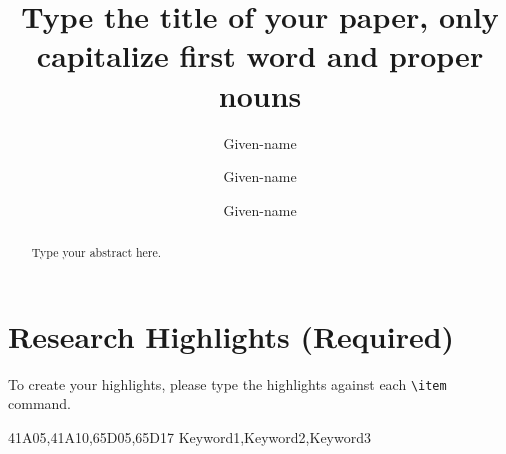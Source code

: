 \documentclass[times,twocolumn,final,authoryear]{elsarticle}
\begin{document}
\begin{table}[!t]
\ifpreprint\else\vspace*{-15pc}\fi

\section*{Research Highlights (Required)}

To create your highlights, please type the highlights against each
\verb+\item+ command. 

\vskip1pc

\fboxsep=6pt

\end{table}

\clearpage


\ifpreprint
  \setcounter{page}{1}
\else
  \setcounter{page}{1}
\fi

\begin{frontmatter}

\title{Type the title of your paper, only capitalize first
word and proper nouns}

\author[1]{Given-name } 
\author[2]{Given-name }
\author[2]{Given-name }

\address[1]{Affiliation 1, Address, City and Postal Code, Country}
\address[2]{Affiliation 2, Address, City and Postal Code, Country}



\begin{abstract}
Type your abstract here. 
\end{abstract}

\begin{keyword}
\MSC 41A05\sep 41A10\sep 65D05\sep 65D17
\KWD Keyword1\sep Keyword2\sep Keyword3

\end{keyword}

\end{frontmatter}





\end{document}
